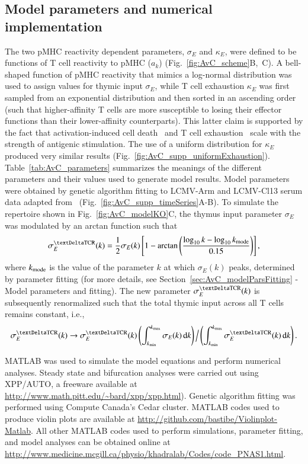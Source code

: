 \subsection{Model parameters and numerical implementation}
The two pMHC reactivity dependent parameters, $\sigma_E$ and $\kappa_E$, were defined to be functions of T cell reactivity to pMHC ($a_k$) (Fig.~\ref{fig:AvC_scheme}B,~C). A bell-shaped function of pMHC reactivity that mimics a log-normal distribution was used to assign values for thymic input $\sigma_E$, while T cell exhaustion $\kappa_E$ was first sampled from an exponential distribution and then sorted in an ascending order (such that higher-affinity T cells are more susceptible to losing their effector functions than their lower-affinity counterparts). This latter claim is supported by the fact that activation-induced cell death~\cite{alexander1996role} and T cell exhaustion~\cite{wherry2003viral,shakiba2021tcr} scale with the strength of antigenic stimulation. The use of a uniform distribution for $\kappa_E$ produced very similar results (Fig.~\ref{fig:AvC_supp_uniformExhaustion}). Table~\ref{tab:AvC_parameters} summarizes the meanings of the different parameters and their values used to generate model results. Model parameters were obtained by genetic algorithm fitting to LCMV-Arm and LCMV-Cl13 serum data adapted from~\cite{wherry2003viral} (Fig.~\ref{fig:AvC_supp_timeSeries}A-B). To simulate the \dTCR{} repertoire shown in Fig.~\ref{fig:AvC_modelKO}C, the thymus input parameter $\sigma_E$ was modulated by an arctan function such that
%
\begin{equation*}
    \sigma_E^{\textrm{\dTCR{}}}(k) = \frac{1}{2} \sigma_E(k) \left[ 1 - \arctan\left( \frac{\log_{10}k - \log_{10}\kmode{}}{0.15} \right) \right],
\end{equation*}
%
where $k_{\textrm{mode}}$ is the value of the parameter $k$ at which $\sigma_E(k)$ peaks, determined by parameter fitting (for more details, see Section~\ref{sec:AvC_modelParsFitting} - Model parameters and fitting). The new parameter $\sigma_E^{\textrm{\dTCR{}}}(k)$ is subsequently renormalized such that the total thymic input across all T cells remains constant, i.e.,
%
\begin{equation*}
    \sigma_E^{\textrm{\dTCR{}}}(k) \rightarrow \sigma_E^{\textrm{\dTCR{}}}(k) \left( \int_{\kmin{}}^{\kmax{}} \sigma_E (k) \, \dd k \right) \Big/ \left( \int_{\kmin{}}^{\kmax{}} \sigma_E^{\textrm{\dTCR{}}}(k) \, \dd k \right).
\end{equation*}

MATLAB was used to simulate the model equations and perform numerical analyses. Steady state and bifurcation analyses were carried out using XPP/AUTO, a freeware available at \url{http://www.math.pitt.edu/~bard/xpp/xpp.html}). Genetic algorithm fitting was performed using Compute Canada’s Cedar cluster. MATLAB codes used to produce violin plots are available at \url{http://github.com/bastibe/Violinplot-Matlab}. All other MATLAB codes used to perform simulations, parameter fitting, and model analyses can be obtained online at \url{http://www.medicine.mcgill.ca/physio/khadralab/Codes/code_PNAS1.html}.


